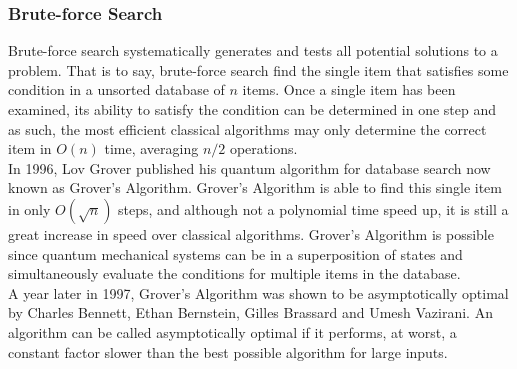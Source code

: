 \documentclass[reqno]{amsart}
\numberwithin{equation}{section}
\numberwithin{figure}{section}
\begin{document}
\subsubsection{Brute-force Search}
\begin{justify}
Brute-force search systematically generates and tests all potential solutions to a problem. That is to say, brute-force search find the single item that satisfies some condition in a unsorted database of $n$ items. Once a single item has been examined, its ability to satisfy the condition can be determined in one step and as such, the most efficient classical algorithms may only determine the correct item in $O(n)$ time, averaging $n/2$ operations. \\

In 1996, Lov Grover published his quantum algorithm for database search \cite{Grover1996} now known as Grover's Algorithm. Grover's Algorithm is able to find this single item in only $O(\sqrt{n})$ steps, and although not a polynomial time speed up, it is still a great increase in speed over classical algorithms. Grover's Algorithm is possible since quantum mechanical systems can be in a superposition of states and simultaneously evaluate the conditions for multiple items in the database. \\

A year later in 1997, Grover's Algorithm was shown to be asymptotically optimal by Charles Bennett, Ethan Bernstein, Gilles Brassard and Umesh Vazirani. \cite{BennettBernsteinBrassardVazirani1997} An algorithm can be called asymptotically optimal if it performs, at worst, a constant factor slower than the best possible algorithm for large inputs.
\end{justify}
\end{document}
